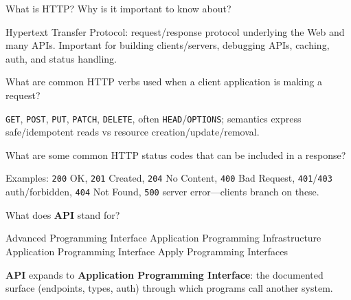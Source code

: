 



\question[4]
What is HTTP? Why is it important to know about?
\begin{solutionorbox}[1.25in]
  Hypertext Transfer Protocol: request/response protocol underlying the Web and many APIs. Important for building clients/servers, debugging APIs, caching, auth, and status handling.
\end{solutionorbox}

\question[4]
What are common HTTP verbs used when a client application is making a request?
\begin{solutionorbox}[1.15in]
  \texttt{GET}, \texttt{POST}, \texttt{PUT}, \texttt{PATCH}, \texttt{DELETE}, often \texttt{HEAD}/\texttt{OPTIONS}; semantics express safe/idempotent reads vs resource creation/update/removal.
\end{solutionorbox}

\question[4]
What are some common HTTP status codes that can be included in a response?
\begin{solutionorbox}[1.35in]
  Examples: \texttt{200} OK, \texttt{201} Created, \texttt{204} No Content, \texttt{400} Bad Request, \texttt{401}/\texttt{403} auth/forbidden, \texttt{404} Not Found, \texttt{500} server error---clients branch on these.
\end{solutionorbox}

\newpage



\question[4]
What does \textbf{API} stand for?
\begin{choices}
  \choice Advanced Programming Interface
  \choice Application Programming Infrastructure
  \CorrectChoice Application Programming Interface
  \choice Apply Programming Interfaces
\end{choices}
\begin{solution}
  \textbf{API} expands to \textbf{Application Programming Interface}: the documented surface (endpoints, types, auth) through which programs call another system.
\end{solution}

